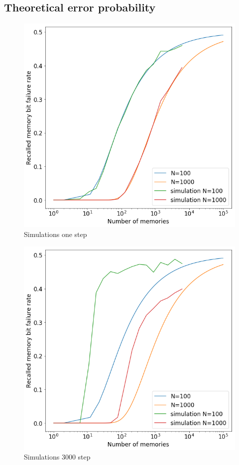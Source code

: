 \documentclass[twoside,twocolumn]{article}
\begin{document}
\subsection{ Theoretical error probability}
\begin{figure}[h]
  \centering
    \includegraphics[width=\linewidth]{1a}
  \caption{Simulations one step}
  \label{sub:ep1}
\end{figure}

\begin{figure}[h]
  \centering
    \includegraphics[width=\linewidth]{1}
  \caption{Simulations 3000 step}
  \label{sub:ep3000}
\end{figure}
\end{document}

